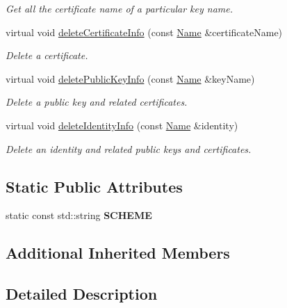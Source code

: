 \begin{DoxyCompactItemize}
\begin{DoxyCompactList}\small\item\em Get all the certificate name of a particular key name. \end{DoxyCompactList}\item 
virtual void \hyperlink{classndn_1_1SecPublicInfoSqlite3_aed78346aac8d42ce0ef6bf0e2b8e9d91}{delete\+Certificate\+Info} (const \hyperlink{classndn_1_1Name}{Name} \&certificate\+Name)
\begin{DoxyCompactList}\small\item\em Delete a certificate. \end{DoxyCompactList}\item 
virtual void \hyperlink{classndn_1_1SecPublicInfoSqlite3_ae619f25af056880af77597955c637030}{delete\+Public\+Key\+Info} (const \hyperlink{classndn_1_1Name}{Name} \&key\+Name)
\begin{DoxyCompactList}\small\item\em Delete a public key and related certificates. \end{DoxyCompactList}\item 
virtual void \hyperlink{classndn_1_1SecPublicInfoSqlite3_a5eb2c1cef293e5ac2297d235726e55db}{delete\+Identity\+Info} (const \hyperlink{classndn_1_1Name}{Name} \&identity)
\begin{DoxyCompactList}\small\item\em Delete an identity and related public keys and certificates. \end{DoxyCompactList}\end{DoxyCompactItemize}
\subsection*{Static Public Attributes}
\begin{DoxyCompactItemize}
\item 
static const std\+::string {\bfseries S\+C\+H\+E\+ME}\hypertarget{classndn_1_1SecPublicInfoSqlite3_a9b7dbcdc4931681f90f09a6f4eef9b53}{}\label{classndn_1_1SecPublicInfoSqlite3_a9b7dbcdc4931681f90f09a6f4eef9b53}

\end{DoxyCompactItemize}
\subsection*{Additional Inherited Members}


\subsection{Detailed Description}



